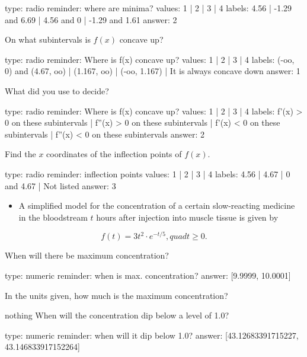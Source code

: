 \documentclass[12pt]{article}
\begin{document}
\begin{answer}
type: radio
reminder: where are minima?
values: 1 | 2 | 3 | 4
labels: 4.56 | -1.29 and 6.69 | 4.56 and 0 | -1.29 and 1.61
answer: 2
\end{answer}

On what subintervals is $f(x)$ concave up?

\begin{answer}
type: radio
reminder: Where is f(x) concave up?
values: 1 | 2 | 3 | 4
labels: (-oo, 0) and (4.67, oo) | (1.167, oo) | (-oo, 1.167) | It is always concave down
answer: 1
\end{answer}

What did you use to decide?

\begin{answer}
type: radio
reminder: Where is f(x) concave up?
values: 1 | 2 | 3 | 4
labels: f'(x) > 0 on these subintervals | f''(x) > 0 on these subintervals | f'(x) < 0 on these subintervals | f''(x) < 0 on these subintervals
answer: 2
\end{answer}

Find the $x$ coordinates of the inflection points of $f(x)$.

\begin{answer}
type: radio
reminder: inflection points
values: 1 | 2 | 3 | 4
labels: 4.56 | 4.67 | 0 and 4.67 | Not listed
answer: 3
\end{answer}

\begin{itemize}
\itemsep1pt\parskip0pt
\item
  A simplified model for the concentration of a certain slow-reacting
  medicine in the bloodstream $t$ hours after injection into muscle
  tissue is given by
\end{itemize}

\[
f(t) =  3t^2 \cdot e^{-t/5}, quad t \geq 0.
\]

When will there be maximum concentration?

\begin{answer}
    type: numeric
    reminder: when is max. concentration?
    answer: [9.9999, 10.0001]

\end{answer}

In the units given, how much is the maximum concentration?

nothing
When will the concentration dip below a level of 1.0?

\begin{answer}
    type: numeric
    reminder: when will it dip below 1.0?
    answer: [43.12683391715227, 43.146833917152264]

\end{answer}
\end{document}
